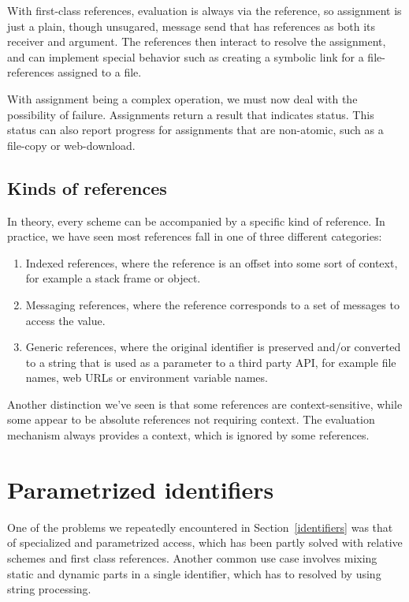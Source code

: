 \documentclass[preprint]{sigplanconf}
\begin{document}
With first-class references, evaluation is always via the reference, so assignment is just a plain, though unsugared,
message send that has references as both its receiver and argument.  The references then interact to resolve
the assignment, and can implement special behavior such as creating a symbolic link for a file-references assigned
to a file.

With assignment being a complex operation, we must now deal with the possibility of failure.  Assignments 
return a result that indicates status.  This status can also report progress for assignments that are
non-atomic, such as a file-copy or web-download.



\subsection{Kinds of references}
\label{refkinds}
In theory, every scheme can be accompanied by a specific kind of reference.  In practice, we have 
seen most references fall in one of three different categories:

\begin{enumerate}
\item Indexed references, where the reference is an offset into some sort of context, for
	example a stack frame or object.
\item Messaging references, where the reference corresponds to a set of messages to
	access the value.
\item Generic references, where the original identifier is preserved and/or converted to
	a string that is used as a parameter to a third party API, for example file names,
	web URLs or environment variable names.
\end{enumerate}

Another distinction we've seen is that some references are context-sensitive, while some
appear to be absolute references not requiring context.  The evaluation mechanism always
provides a context, which is ignored by some references.  


\section{Parametrized identifiers}
\label{parametrized}

One of the problems we repeatedly encountered in Section~\ref{identifiers} was 
that of specialized and parametrized access, which has been partly solved with
relative schemes and first class references.  Another common use case involves
mixing static and dynamic parts in a single identifier, which has to resolved by
using string processing.
\end{document}
